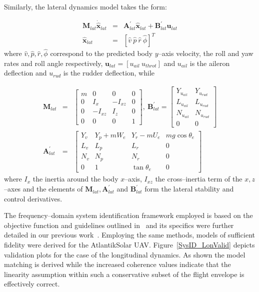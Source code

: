 Similarly, the lateral dynamics model takes the form:

\small
\begin{eqnarray}\label{LAT_DYN}
 \mathbf{M}_{lat}\dot{\mathbf{\hat{x}}}_{lat} &=& \mathbf{A}^\prime_{lat}\mathbf{\hat{x}}_{lat}+\mathbf{B}^\prime_{lat}\mathbf{u}_{lat} \\ \nonumber
 \mathbf{\hat{x}}_{lat} &=& \left[\hat{v}~\hat{p}~\hat{r}~\hat{\phi} \right]^T
\end{eqnarray}
\normalsize
where $\hat{v},\hat{p},\hat{r},\hat{\phi}$ correspond to the predicted body $y$--axis velocity, the roll and yaw rates and roll angle respectively, $\mathbf{u}_{lat}=[u_{ail}~u_{throt}]$ and $u_{ail}$ is the aileron deflection and $u_{rud}$ is the rudder deflection, while

\footnotesize
\begin{eqnarray}
\mathbf{M}_{lat} &=& \begin{bmatrix}
m & 0 & 0 & 0\\ 
0 & I_x & -I_{xz} & 0\\ 
0 & -I_{xz} & I_z & 0\\ 
0 & 0 & 0 & 1
\end{bmatrix},~ \mathbf{B}^\prime_{lat} = \begin{bmatrix}
Y_{u_{ail}} & Y_{u_{rud}}\\ 
L_{u_{ail}} & L_{u_{rud}}\\ 
N_{u_{ail}} & N_{u_{rud}}\\ 
0 & 0
\end{bmatrix}\\ \nonumber 
\mathbf{A}^\prime_{lat} &=& \begin{bmatrix}

Y_v & Y_p + mW_e & Y_r-mU_e & mg\cos\theta_e\\ 
L_v & L_p & L_r & 0\\ 
N_v & N_p & N_r & 0 \\ 
0 & 1 & \tan\theta_e & 0
\end{bmatrix}
\end{eqnarray}
\normalsize
where $I_x$ the inertia around the body $x$--axis, $I_{xz}$ the cross--inertia term of the $x,z$--axes and the elements of $\mathbf{M}_{lat},\mathbf{A}^\prime_{lat}$ and $\mathbf{B}^\prime_{lat}$ form the lateral stability and control derivatives. 

The frequency--domain system identification framework employed is based on the objective function and guidelines outlined in~\cite{TISCHLER_BOOK} and its specifics were further detailed in our previous work~\cite{OMLAS_MED_14}. Employing the same methods, models of sufficient fidelity were derived for the AtlantikSolar UAV. Figure~\ref{SysID_LonValid} depicts validation plots for the case of the longitudinal dynamics. As shown the model matching is  derived while the increased coherence values indicate that the linearity assumption within such a conservative subset of the flight envelope is effectively correct. 

